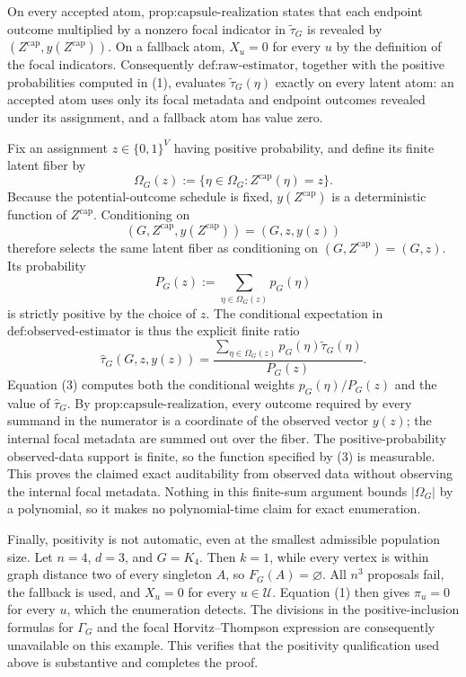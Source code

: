 On every accepted atom, \(\text{prop:capsule-realization}\) states that each endpoint outcome multiplied by a nonzero focal indicator in \(\widetilde\tau_G\) is revealed by \((Z^{\mathrm{cap}},y(Z^{\mathrm{cap}}))\). On a fallback atom, \(X_u=0\) for every \(u\) by the definition of the focal indicators. Consequently \(\text{def:raw-estimator}\), together with the positive probabilities computed in (1), evaluates \(\widetilde\tau_G(\eta)\) exactly on every latent atom: an accepted atom uses only its focal metadata and endpoint outcomes revealed under its assignment, and a fallback atom has value zero.

Fix an assignment \(z\in\{0,1\}^V\) having positive probability, and define its finite latent fiber by
\[
\Omega_G(z)
:=\bigl\{\eta\in\Omega_G:Z^{\mathrm{cap}}(\eta)=z\bigr\}.
\]
Because the potential-outcome schedule is fixed, \(y(Z^{\mathrm{cap}})\) is a deterministic function of \(Z^{\mathrm{cap}}\). Conditioning on
\[
(G,Z^{\mathrm{cap}},y(Z^{\mathrm{cap}}))=(G,z,y(z))
\]
therefore selects the same latent fiber as conditioning on \((G,Z^{\mathrm{cap}})=(G,z)\). Its probability
\[
P_G(z):=\sum_{\eta\in\Omega_G(z)}p_G(\eta)
\]
is strictly positive by the choice of \(z\). The conditional expectation in \(\text{def:observed-estimator}\) is thus the explicit finite ratio
\[
\widehat\tau_G(G,z,y(z))
=\frac{\displaystyle\sum_{\eta\in\Omega_G(z)}p_G(\eta)\widetilde\tau_G(\eta)}
{\displaystyle P_G(z)}.
\tag{3}
\]
Equation (3) computes both the conditional weights \(p_G(\eta)/P_G(z)\) and the value of \(\widehat\tau_G\). By \(\text{prop:capsule-realization}\), every outcome required by every summand in the numerator is a coordinate of the observed vector \(y(z)\); the internal focal metadata are summed out over the fiber. The positive-probability observed-data support is finite, so the function specified by (3) is measurable. This proves the claimed exact auditability from observed data without observing the internal focal metadata. Nothing in this finite-sum argument bounds \(\lvert\Omega_G\rvert\) by a polynomial, so it makes no polynomial-time claim for exact enumeration.

Finally, positivity is not automatic, even at the smallest admissible population size. Let \(n=4\), \(d=3\), and \(G=K_4\). Then \(k=1\), while every vertex is within graph distance two of every singleton \(A\), so \(F_G(A)=\varnothing\). All \(n^3\) proposals fail, the fallback is used, and \(X_u=0\) for every \(u\in\mathcal U\). Equation (1) then gives \(\pi_u=0\) for every \(u\), which the enumeration detects. The divisions in the positive-inclusion formulas for \(\Gamma_G\) and the focal Horvitz--Thompson expression are consequently unavailable on this example. This verifies that the positivity qualification used above is substantive and completes the proof.
